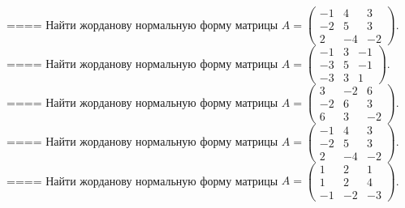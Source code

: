 ====
Найти жорданову нормальную форму матрицы \(A = \begin{pmatrix}
 - 1 & 4 & 3 \\
 - 2 & 5 & 3 \\
2 & - 4 & - 2
\end{pmatrix}\).
====
Найти жорданову нормальную форму матрицы \(A = \begin{pmatrix}
 - 1 & 3 & - 1 \\
 - 3 & 5 & - 1 \\
 - 3 & 3 & 1
\end{pmatrix}\).
====
Найти жорданову нормальную форму матрицы \(A = \begin{pmatrix}
3 & - 2 & 6 \\
 - 2 & 6 & 3 \\
6 & 3 & - 2
\end{pmatrix}\).
====
Найти жорданову нормальную форму матрицы \(A = \begin{pmatrix}
 - 1 & 4 & 3 \\
 - 2 & 5 & 3 \\
2 & - 4 & - 2
\end{pmatrix}\).
====
Найти жорданову нормальную форму матрицы \(A = \begin{pmatrix}
1 & 2 & 1 \\
1 & 2 & 4 \\
 - 1 & - 2 & - 3
\end{pmatrix}\).